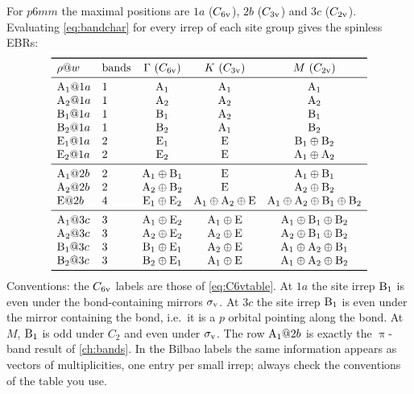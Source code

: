 For $p6mm$ the maximal positions are $1a$ ($C_{6\mathrm{v}}$), $2b$ ($C_{3\mathrm{v}}$) and $3c$
($C_{2\mathrm{v}}$). Evaluating \eqref{eq:bandchar} for every irrep of each site group gives
the spinless EBRs:
\begin{equation}\label{eq:ebrp6mm}
\begin{array}{llccc}
\toprule
\rho@w & \text{bands} & \Gamma\ (\Cv{6}) & K\ (\Cv{3}) & M\ (\Cv{2})\\
\midrule
\irr{A}_1@1a & 1 & \irr{A}_1 & \irr{A}_1 & \irr{A}_1\\
\irr{A}_2@1a & 1 & \irr{A}_2 & \irr{A}_2 & \irr{A}_2\\
\irr{B}_1@1a & 1 & \irr{B}_1 & \irr{A}_2 & \irr{B}_1\\
\irr{B}_2@1a & 1 & \irr{B}_2 & \irr{A}_1 & \irr{B}_2\\
\irr{E}_1@1a & 2 & \irr{E}_1 & \irr{E} & \irr{B}_1\oplus\irr{B}_2\\
\irr{E}_2@1a & 2 & \irr{E}_2 & \irr{E} & \irr{A}_1\oplus\irr{A}_2\\
\midrule
\irr{A}_1@2b & 2 & \irr{A}_1\oplus\irr{B}_1 & \irr{E} & \irr{A}_1\oplus\irr{B}_1\\
\irr{A}_2@2b & 2 & \irr{A}_2\oplus\irr{B}_2 & \irr{E} & \irr{A}_2\oplus\irr{B}_2\\
\irr{E}@2b & 4 & \irr{E}_1\oplus\irr{E}_2 & \irr{A}_1\oplus\irr{A}_2\oplus\irr{E} &
   \irr{A}_1\oplus\irr{A}_2\oplus\irr{B}_1\oplus\irr{B}_2\\
\midrule
\irr{A}_1@3c & 3 & \irr{A}_1\oplus\irr{E}_2 & \irr{A}_1\oplus\irr{E} & \irr{A}_1\oplus\irr{B}_1\oplus\irr{B}_2\\
\irr{A}_2@3c & 3 & \irr{A}_2\oplus\irr{E}_2 & \irr{A}_2\oplus\irr{E} & \irr{A}_2\oplus\irr{B}_1\oplus\irr{B}_2\\
\irr{B}_1@3c & 3 & \irr{B}_1\oplus\irr{E}_1 & \irr{A}_2\oplus\irr{E} & \irr{A}_1\oplus\irr{A}_2\oplus\irr{B}_1\\
\irr{B}_2@3c & 3 & \irr{B}_2\oplus\irr{E}_1 & \irr{A}_1\oplus\irr{E} & \irr{A}_1\oplus\irr{A}_2\oplus\irr{B}_2\\
\bottomrule
\end{array}
\end{equation}
Conventions: the $C_{6\mathrm{v}}$ labels are those of \eqref{eq:C6vtable}. At $1a$ the site
irrep $\mathrm{B}_1$ is even under the bond-containing mirrors $\sigma_{\mathrm{v}}$. At $3c$ the site
irrep $\mathrm{B}_1$ is even under the mirror containing the bond, i.e.\ it is a
$p$ orbital pointing along the bond. At $M$, $\mathrm{B}_1$ is odd under $C_2$ and even
under $\sigma_{\mathrm{v}}$. The row $\mathrm{A}_1@2b$ is exactly the $\uppi$-band result of \cref{ch:bands}.
In the Bilbao labels the same information appears as vectors of multiplicities, one
entry per small irrep; always check the conventions of the table you use.

